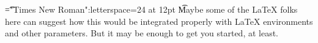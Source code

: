 \font\t="Times New Roman":letterspace=24 at 12pt
\t{Maybe some of the LaTeX folks here can suggest how this would be integrated properly with LaTeX environments and other parameters. But it may be enough to get you started, at least. }


\bye
